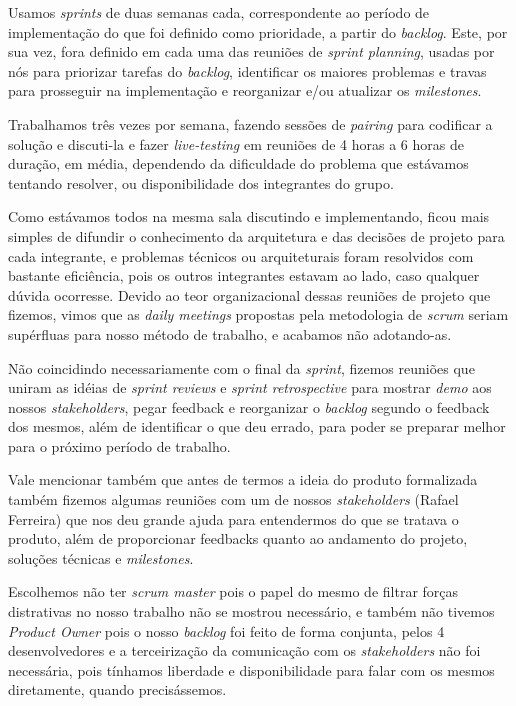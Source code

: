         Usamos \textit{sprints} de duas semanas cada, correspondente ao período de implementação do que foi definido como prioridade, a partir do \textit{backlog}. Este, por sua vez, fora definido em cada uma das reuniões de \textit{sprint planning}, usadas por nós para priorizar tarefas do \textit{backlog}, identificar os maiores problemas e travas para prosseguir na implementação e reorganizar e/ou atualizar os \textit{milestones}.\par
        
        Trabalhamos três vezes por semana, fazendo sessões de \textit{pairing} para codificar a solução e discuti-la e fazer \textit{live-testing} em reuniões de 4 horas a 6 horas de duração, em média, dependendo da dificuldade do problema que estávamos tentando resolver, ou disponibilidade dos integrantes do grupo.
        
        Como estávamos todos na mesma sala discutindo e implementando, ficou mais simples de difundir o conhecimento da arquitetura e das decisões de projeto para cada integrante, e problemas técnicos ou arquiteturais foram resolvidos com bastante eficiência, pois os outros integrantes estavam ao lado, caso qualquer dúvida ocorresse. Devido ao teor organizacional dessas reuniões de projeto que fizemos, vimos que as \textit{daily meetings} propostas pela metodologia de \textit{scrum} seriam supérfluas para nosso método de trabalho, e acabamos não adotando-as.
        
        Não coincidindo necessariamente com o final da \textit{sprint}, fizemos reuniões que uniram as idéias de \textit{sprint reviews} e \textit{sprint retrospective} para mostrar \textit{demo} aos nossos \textit{stakeholders}, pegar feedback e reorganizar o \textit{backlog} segundo o feedback dos mesmos, além de identificar o que deu errado, para poder se preparar melhor para o próximo período de trabalho. 
        
        Vale mencionar também que antes de termos a ideia do produto formalizada também fizemos algumas reuniões com um de nossos \textit{stakeholders} (Rafael Ferreira) que nos deu grande ajuda para entendermos do que se tratava o produto, além de proporcionar feedbacks quanto ao andamento do projeto, soluções técnicas e \textit{milestones}.
        
        Escolhemos não ter \textit{scrum master} pois o papel do mesmo de filtrar forças distrativas no nosso trabalho não se mostrou necessário, e também não tivemos \textit{Product Owner} pois o nosso \textit{backlog} foi feito de forma conjunta, pelos 4 desenvolvedores e a terceirização da comunicação com os \textit{stakeholders} não foi necessária, pois tínhamos liberdade e disponibilidade para falar com os mesmos diretamente, quando precisássemos.

